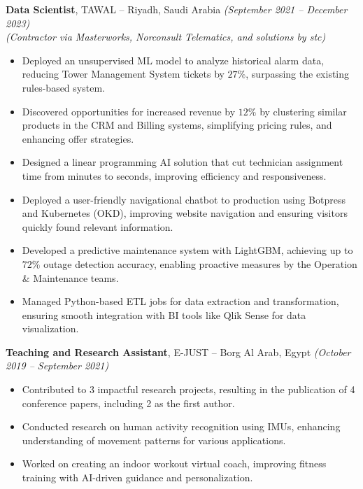\documentclass[10pt, letterpaper]{article}
\newenvironment{highlights}{
    \begin{itemize}[topsep=0.1cm, parsep=0.1cm, itemsep=0pt, leftmargin=1em]
}{
    \end{itemize}
}
\begin{document}
\textbf{Data Scientist}, TAWAL -- Riyadh, Saudi Arabia \textit{(September 2021 – December 2023)} \\
\textit{(Contractor via Masterworks, Norconsult Telematics, and solutions by stc)} \\
\begin{highlights}
    \item Deployed an unsupervised ML model to analyze historical alarm data, reducing Tower Management System tickets by $27\%$, surpassing the existing rules-based system.
    \item Discovered opportunities for increased revenue by $12\%$ by clustering similar products in the CRM and Billing systems, simplifying pricing rules, and enhancing offer strategies.
    \item Designed a linear programming AI solution that cut technician assignment time from minutes to seconds, improving efficiency and responsiveness.
    \item Deployed a user-friendly navigational chatbot to production using Botpress and Kubernetes (OKD), improving website navigation and ensuring visitors quickly found relevant information.
    \item Developed a predictive maintenance system with LightGBM, achieving up to $72\%$ outage detection accuracy, enabling proactive measures by the Operation \& Maintenance teams.
    \item Managed Python-based ETL jobs for data extraction and transformation, ensuring smooth integration with BI tools like Qlik Sense for data visualization.
\end{highlights}

\vspace{0.3cm}

\textbf{Teaching and Research Assistant}, E-JUST -- Borg Al Arab, Egypt \textit{(October 2019 – September 2021)} \\
\begin{highlights}
    \item Contributed to 3 impactful research projects, resulting in the publication of 4 conference papers, including 2 as the first author.
    \item Conducted research on human activity recognition using IMUs, enhancing understanding of movement patterns for various applications.
    \item Worked on creating an indoor workout virtual coach, improving fitness training with AI-driven guidance and personalization.
\end{highlights}
\end{document}
